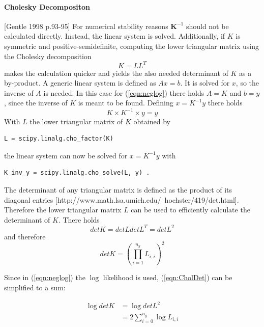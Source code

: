 \documentclass[%
  a4paper,oneside,%
  11pt,%
  smallchapters,
  green,%
  rgb, <cmyk>
  ,]{tubsbook}
\begin{document}
\paragraph{Cholesky Decompositon}
[Gentle 1998 p.93-95]
For numerical stability reasons $\bm{K}^{-1}$ should not be calculated directly. Instead, the linear system is solved. Additionally, if $K$ is symmetric and positive-semidefinite, computing the lower triangular matrix using the Cholesky decomposition 
\begin{equation}
K = LL^T
\end{equation}
makes the calculation quicker and yields the also needed determinant of $K$ as a by-product. 
A generic linear system is defined as $A x = b$. It is solved for $x$, so the inverse of $A$ is needed. In this case for (\ref{eqn:neglog}) there holds $A=K$ and $b = y$, since the inverse of $K$ is meant to be found. Defining $x = K^{-1}y$ there holds
\begin{equation}
K \times K^{-1} \times y = y
\end{equation}
%
With $L$ the lower triangular matrix of $K$ obtained by 
\begin{lstlisting}[language=Python]
L = scipy.linalg.cho_factor(K)
\end{lstlisting}
the linear system can now be solved for $x = K^{-1}y$ with
\begin{lstlisting}[language=Python]
K_inv_y = scipy.linalg.cho_solve(L, y) .
\end{lstlisting}

The determinant of any triangular matrix is defined as the product of its diagonal entries [http://www.math.lsa.umich.edu/~hochster/419/det.html]. Therefore the lower triangular matrix $L$ can be used to efficiently calculate the determinant of $K$. There holds
\begin{equation}
det K = det L det L^T = det L ^2
\end{equation}
and therefore
\begin{equation}
det K = \left(    \prod_{i=1}^{n_y}  L_{i,i}  \right)^2
\label{eqn:CholDet}
\end{equation}

Since in (\ref{eqn:neglog}) the $\log$ likelihood is used, (\ref{eqn:CholDet}) can be simplified to a sum:

\begin{align*}
\log{det K} &= \log{det L}^2 \\
&= 2 \sum_{i=0}^{n_y} \log{L_{i,i}}
\end{align*}
\end{document}
